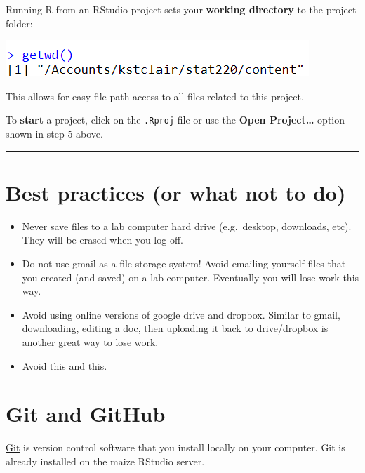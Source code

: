 \documentclass[
]{book}
\providecommand{\tightlist}{%
  \setlength{\itemsep}{0pt}\setlength{\parskip}{0pt}}
\begin{document}
Running R from an RStudio project sets your \textbf{working directory} to the
project folder:

\includegraphics{img/maize_getwd.png}

This allows for easy file path access to all files related to this
project.

To \textbf{start} a project, click on the \texttt{.Rproj} file or use the \textbf{Open
Project\ldots{}} option shown in step 5 above.

\begin{center}\rule{0.5\linewidth}{0.5pt}\end{center}

\hypertarget{best-practices-or-what-not-to-do}{%
\section{Best practices (or what not to do)}\label{best-practices-or-what-not-to-do}}

\begin{itemize}
\tightlist
\item
  Never save files to a lab computer hard drive (e.g.~desktop,
  downloads, etc). They will be erased when you log off.
\item
  Do not use gmail as a file storage system! Avoid emailing yourself
  files that you created (and saved) on a lab computer. Eventually you
  will lose work this way.
\item
  Avoid using online versions of google drive and dropbox. Similar to
  gmail, downloading, editing a doc, then uploading it back to
  drive/dropbox is another great way to lose work.
\item
  Avoid \href{https://xkcd.com/1459/}{this} and \href{http://phdcomics.com/comics.php?f=1531}{this}.
\end{itemize}

\hypertarget{git-and-github}{%
\section{Git and GitHub}\label{git-and-github}}

\href{https://happygitwithr.com/big-picture.html\#why-git}{Git} is version
control software that you install locally on your computer. Git is
already installed on the maize RStudio server.
\end{document}
